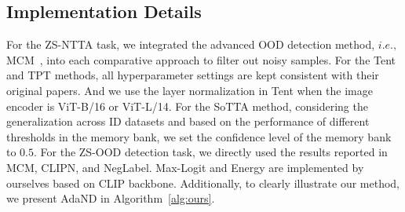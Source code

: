 \begin{table}[ht]
  \caption{Number of classes in ID and OOD datasets. Each row shows an ID-OOD dataset pair with their respective number of classes.}
  \label{tab:id-ood-pairs-class-ratio}
  \vspace{5pt}
  \centering
\end{table}





\subsection{Implementation Details}\label{app: baseline methods}
For the ZS-NTTA task, we integrated the advanced OOD detection method, $i.e.,$ MCM~\citep{ming2022delving}, into each comparative approach to filter out noisy samples. 
For the Tent and TPT methods, all hyperparameter settings are kept consistent with their original papers. 
And we use the layer normalization in Tent when the image encoder is ViT-B/16 or ViT-L/14.
For the SoTTA method, considering the generalization across ID datasets and based on the performance of different thresholds in the memory bank, we set the confidence level of the memory bank to $0.5$. For the ZS-OOD detection task, we directly used the results reported in MCM, CLIPN, and NegLabel. Max-Logit and Energy are implemented by ourselves based on CLIP backbone. Additionally, to clearly illustrate our method, we present AdaND in Algorithm~\ref{alg:ours}.



